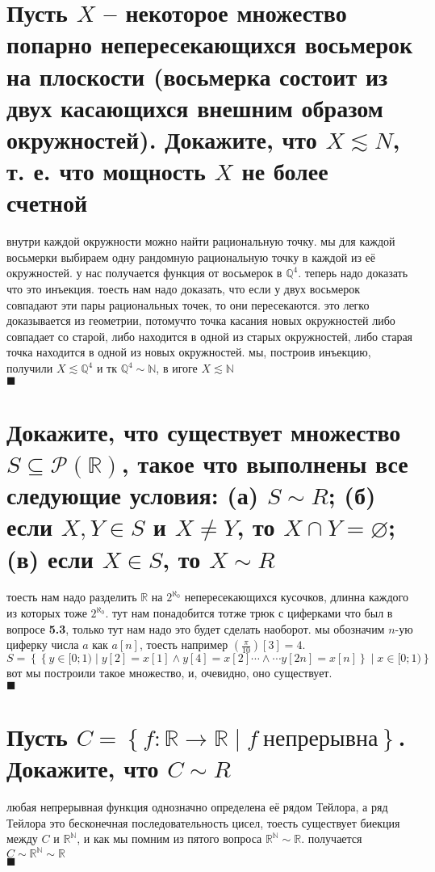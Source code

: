 \documentclass{article}
\newcommand{\ds}{\displaystyle}
\newcommand{\N}{\mathbb{N}}
\newcommand{\Q}{\mathbb{Q}}
\newcommand{\R}{\mathbb{R}}
\newcommand{\Aleph}{2^{\aleph_0}}
\renewcommand{\f}{\frac}
\renewcommand{\l}{\left}
\renewcommand{\r}{\right}
\renewcommand{\P}[1]{\mathcal{P}\l(#1\r)}
\renewcommand{\emptyset}{\varnothing}
\begin{document}
  \section{Пусть $X$ -- некоторое множество попарно непересекающихся восьмерок на плоскости (восьмерка состоит из двух касающихся внешним образом окружностей). Докажите, что $X \lesssim N$, т. е. что мощность $X$ не более счетной}
  внутри каждой окружности можно найти рациональную точку.
  мы для каждой восьмерки выбираем одну рандомную рациональную точку в каждой из её окружностей.
  у нас получается функция от восьмерок в $\Q^4$. теперь надо доказать что это инъекция.
  тоесть нам надо доказать, что если у двух восьмерок совпадают эти пары рациональных точек, то они пересекаются.
  это легко доказывается из геометрии,
  потомучто точка касания новых окружностей либо совпадает со старой,
  либо находится в одной из старых окружностей,
  либо старая точка находится в одной из новых окружностей.
  мы, построив инъекцию, получили $X \lesssim \Q^4$ и тк $\Q^4 \sim \N$, в игоге $X \lesssim \N$ \\
  $\blacksquare$

  \section{Докажите, что существует множество $S \subseteq \P{\R}$, такое что выполнены все следующие условия: (а) $S \sim R$; (б) если $X, Y \in S$ и $X \neq Y$, то $X \cap Y = \emptyset$; (в) если $X \in S$, то $X \sim R$}
  тоесть нам надо разделить $\R$ на $\Aleph$ непересекающихся кусочков, длинна каждого из которых тоже $\Aleph$.
  тут нам понадобится тотже трюк с циферками что был в вопросе \textbf{5.3}, только тут нам надо это будет сделать наоборот.
  мы обозначим $n$-ую циферку числа $a$ как $a\l[n\r]$, тоесть например $\l(\f{\pi}{10}\r)\l[3\r] = 4$. \\
  $\ds S = \l\{ \l\{ y \in [0;1) \mid y[2] = x[1] \land y[4] = x[2] \cdots\land\cdots y[2n] = x[n] \r\} \mid x \in [0;1) \r\}$ \\
  вот мы построили такое множество, и, очевидно, оно существует. \\
  $\blacksquare$

  \section{Пусть $C = \l\{f: \R \to \R \mid f \ \text{непрерывна} \r\}$. Докажите, что $C \sim R$}
  любая непрерывная функция однозначно определена её рядом Тейлора, а ряд Тейлора это бесконечная последовательность цисел,
  тоесть существует биекция между $C$ и $\R^\N$, и как мы помним из пятого вопроса $\R^\N \sim \R$.
  получается $C \sim \R^\N \sim \R$ \\
  $\blacksquare$
\end{document}

